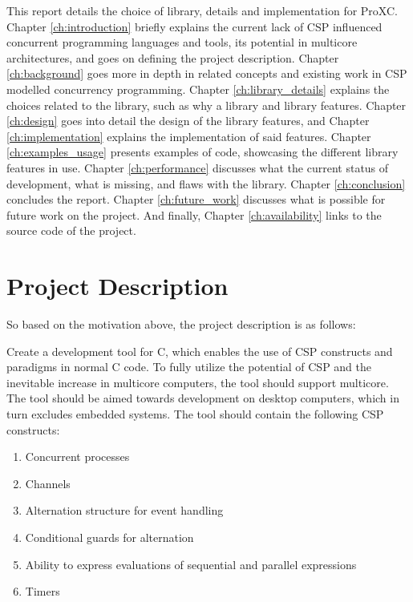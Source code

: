 This report details the choice of library, details and implementation for ProXC. Chapter \ref{ch:introduction} briefly explains the current lack of CSP influenced concurrent programming languages and tools, its potential in multicore architectures, and goes on defining the project description. Chapter \ref{ch:background} goes more in depth in related concepts and existing work in CSP modelled concurrency programming. Chapter \ref{ch:library_details} explains the choices related to the library, such as why a library and library features. Chapter \ref{ch:design} goes into detail the design of the library features, and Chapter \ref{ch:implementation} explains the implementation of said features. Chapter \ref{ch:examples_usage} presents examples of code, showcasing the different library features in use. Chapter \ref{ch:performance} discusses what the current status of development, what is missing, and flaws with the library. Chapter \ref{ch:conclusion} concludes the report. Chapter \ref{ch:future_work} discusses what is possible for future work on the project. And finally, Chapter \ref{ch:availability} links to the source code of the project.


\section{Project Description}
\label{sec:project_description}

So based on the motivation above, the project description is as follows:

Create a development tool for C, which enables the use of CSP constructs and paradigms in normal C code. To fully utilize the potential of CSP and the inevitable increase in multicore computers, the tool should support multicore. The tool should be aimed towards development on desktop computers, which in turn excludes embedded systems. The tool should contain the following CSP constructs:

\begin{enumerate}
    \item Concurrent processes
    \item Channels
    \item Alternation structure for event handling
    \item Conditional guards for alternation
    \item Ability to express evaluations of sequential and parallel expressions
    \item Timers
\end{enumerate}

